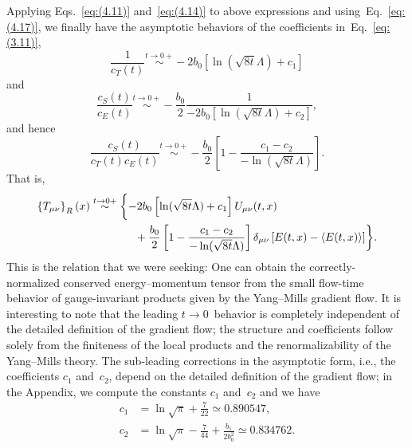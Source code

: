 Applying Eqs.~\eqref{eq:(4.11)} and~\eqref{eq:(4.14)} to above expressions
and using~Eq.~\eqref{eq:(4.17)}, we finally have the asymptotic behaviors of
the coefficients in~Eq.~\eqref{eq:(3.11)},
\begin{equation}
   \frac{1}{c_T(t)}
   \stackrel{t\to0+}{\sim}
   -2b_0\left[\ln(\sqrt{8t}\Lambda)+c_1\right]
\label{eq:(4.26)}
\end{equation}
and
\begin{equation}
   \frac{c_S(t)}{c_E(t)}
   \stackrel{t\to0+}{\sim}
   -\frac{b_0}{2}
   \frac{1}{-2b_0\left[\ln(\sqrt{8t}\Lambda)+c_2\right]},
\label{eq:(4.27)}
\end{equation}
and hence
\begin{equation}
   \frac{c_S(t)}{c_T(t)c_E(t)}
   \stackrel{t\to0+}{\sim}
   -\frac{b_0}{2}
   \left[1-\frac{c_1-c_2}{-\ln(\sqrt{8t}\Lambda)}\right].
\label{eq:(4.28)}
\end{equation}
That is,
\begin{align}
   \left\{T_{\mu\nu}\right\}_R(x)
   &\stackrel{t\to0+}{\sim}
   \biggl\{
   -2b_0\left[\ln(\sqrt{8t}\Lambda)+c_1\right]U_{\mu\nu}(t,x)
\notag\\
   &\qquad\qquad{}
   +\frac{b_0}{2}
   \left[1-\frac{c_1-c_2}{-\ln(\sqrt{8t}\Lambda)}\right]
   \delta_{\mu\nu}
   \left[
   E(t,x)-\left\langle E(t,x)\right\rangle\right]
   \biggr\}.
\label{eq:(4.29)}
\end{align}
This is the relation that we were seeking: One can obtain the
correctly-normalized conserved energy--momentum tensor from the small flow-time
behavior of gauge-invariant products given by the Yang--Mills gradient flow. It
is interesting to note that the leading $t\to0$~behavior is completely
independent of the detailed definition of the gradient flow; the structure and
coefficients follow solely from the finiteness of the local products and the
renormalizability of the Yang--Mills theory. The sub-leading corrections in the
asymptotic form, i.e., the coefficients $c_1$ and~$c_2$, depend on the detailed
definition of the gradient flow; in the Appendix, we compute the constants
$c_1$ and~$c_2$ and we have
\begin{align}
   c_1&=\ln\sqrt{\pi}+\frac{7}{22}
   \simeq0.890547,
\label{eq:(4.30)}
\\
   c_2&=\ln\sqrt{\pi}-\frac{7}{44}
   +\frac{b_1}{2b_0^2}
   \simeq0.834762.
\label{eq:(4.31)}
\end{align}

